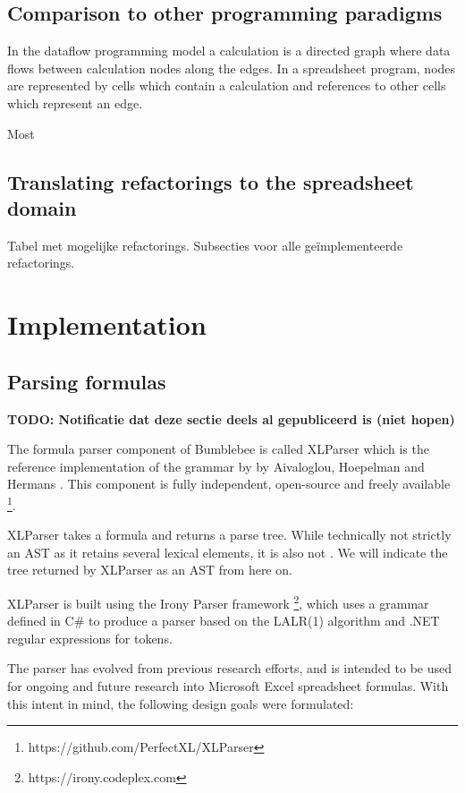 \documentclass[12pt,a4paper,onecolumn,oneside]{memoir}
\newcommand{\todo}[1]{\textbf{TODO: #1}}
\begin{document}
\section{Comparison to other programming paradigms}

In the dataflow programming model a calculation is a directed graph where data flows between calculation nodes along the edges.
In a spreadsheet program, nodes are represented by cells which contain a calculation and references to other cells which represent an edge.

Most 

\section{Translating refactorings to the spreadsheet domain}

Tabel met mogelijke refactorings.
Subsecties voor alle geïmplementeerde refactorings.

\chapter{Implementation}

\section{Parsing formulas}

\todo{Notificatie dat deze sectie deels al gepubliceerd is (niet hopen)}

The formula parser component of Bumblebee is called XLParser which is the reference implementation of the grammar by by Aivaloglou, Hoepelman and Hermans \cite{xlparser}.
This component is fully independent, open-source and freely available \footnote{https://github.com/PerfectXL/XLParser}.

XLParser takes a formula and returns a parse tree.
While technically not strictly an AST as it retains several lexical elements, it is also not .
We will indicate the tree returned by XLParser as an AST from here on.

XLParser is built using the Irony Parser framework \footnote{https://irony.codeplex.com}, which uses a grammar defined in C\# to produce a parser based on the LALR(1) algorithm and .NET regular expressions for tokens.

The parser has evolved from previous research efforts, and is intended to be used for ongoing and future research into Microsoft Excel spreadsheet formulas.
With this intent in mind, the following design goals were formulated:
\end{document}
